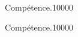 
\begin{pageAlgo} %

\begin{ExoAlgoN}{Compétence.}{1}{0}{0}{0}{0}

\end{ExoAlgoN}

\begin{ExoAlgo}{Compétence.}{1}{0}{0}{0}{0}

\end{ExoAlgo}

\end{pageAlgo} %


\begin{pageBrouillon}

\end{pageBrouillon}



